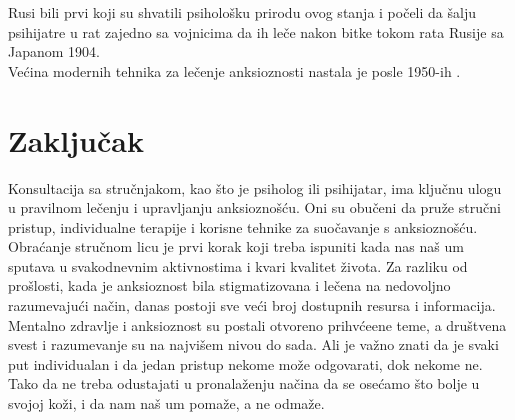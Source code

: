\documentclass[a4paper]{article}
\begin{document}
            Rusi bili prvi koji su shvatili psihološku prirodu ovog stanja i počeli da šalju psihijatre u rat zajedno sa vojnicima da ih leče nakon bitke tokom rata Rusije sa Japanom 1904. \\

            Većina modernih tehnika za lečenje anksioznosti nastala je posle 1950-ih .

		
	

		
		\section{Zaključak}	

            Konsultacija sa stručnjakom, kao što je psiholog ili psihijatar, ima ključnu ulogu u pravilnom lečenju i upravljanju anksioznošću. Oni su obučeni da pruže stručni pristup, individualne terapije i korisne tehnike za suočavanje s anksioznošću. Obraćanje stručnom licu je prvi korak koji treba ispuniti kada nas naš um sputava u svakodnevnim aktivnostima i kvari kvalitet života.  Za razliku od prošlosti, kada je anksioznost bila stigmatizovana i lečena na nedovoljno razumevajući način, danas postoji sve veći broj dostupnih resursa i informacija. Mentalno zdravlje i anksioznost su postali otvoreno prihvćeene teme, a društvena svest i razumevanje su na najvišem nivou do sada. Ali je važno znati da je svaki put individualan i da jedan pristup nekome može odgovarati, dok nekome ne. Tako da ne treba odustajati u pronalaženju načina da se osećamo što bolje u svojoj koži, i da nam naš um pomaže, a ne odmaže.


		

		
	

 	\newpage

		\appendix
		
		\iffalse
		 
		
		\fi
		
\end{document}
